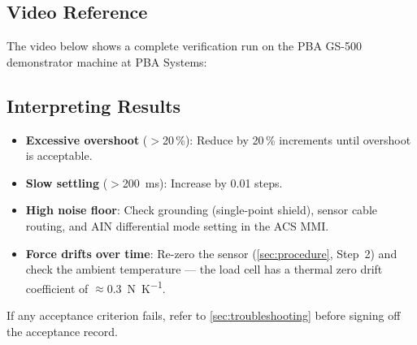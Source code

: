 \subsection{Video Reference}
\label{sec:verif:video}

The video below shows a complete verification run on the PBA GS-500
demonstrator machine at PBA Systems:



\subsection{Interpreting Results}
\label{sec:verif:interpret}

\begin{itemize}[noitemsep]
  \item \textbf{Excessive overshoot} ($>$20\,\%): Reduce  by
        20\,\% increments until overshoot is acceptable.
  \item \textbf{Slow settling} ($>$\SI{200}{\milli\second}): Increase
         by 0.01 steps.
  \item \textbf{High noise floor}: Check grounding (single-point shield),
        sensor cable routing, and AIN differential mode setting in the ACS MMI.
  \item \textbf{Force drifts over time}: Re-zero the sensor (\cref{sec:procedure},
        Step~2) and check the ambient temperature — the load cell has a
        thermal zero drift coefficient of $\approx$\SI{0.3}{\newton\per\kelvin}.
\end{itemize}

If any acceptance criterion fails, refer to \cref{sec:troubleshooting}
before signing off the acceptance record.
